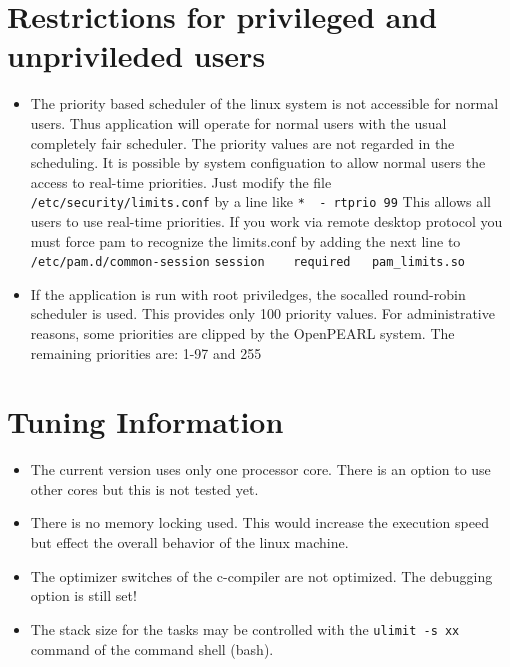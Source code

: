 \documentclass[10pt]{scrbook}
\begin{document}
\section{Restrictions for privileged and unprivileded users}
\begin{itemize}
\item The priority based scheduler of the linux system is not
   accessible for normal users. Thus application will operate for 
   normal users with
   the usual completely fair scheduler. The priority values are 
   not regarded in the scheduling.
   It is possible by system configuation to allow normal users
   the access to real-time priorities. Just modify the file
   \verb|/etc/security/limits.conf| by a line like\newline
   \verb|*  - rtprio 99|\newline
   This allows all users to use real-time priorities.
   \newline
   If you work via remote desktop protocol you must force pam to
   recognize the limits.conf by adding the next line to \verb|/etc/pam.d/common-session|
   \newline
   \verb|session    required   pam_limits.so|
\item If the application is run with root priviledges, the socalled 
  round-robin scheduler is used. This provides only 100 priority values.
  For administrative reasons, some priorities are clipped by the OpenPEARL
  system.
  The remaining priorities are: 1-97 and 255
\end{itemize}

\section{Tuning Information}
\begin{itemize}
\item The current version uses only one processor core.
     There is an option to use other cores but this is not tested yet.
\item There is no memory locking used.
     This would increase the execution speed but effect the overall
     behavior of the linux machine.
\item The optimizer switches of the c-compiler are not optimized.
   The debugging option is still set!
\item The stack size for the tasks may be controlled with the
   \texttt{ulimit -s xx} command of the command shell (bash).
\end{itemize}
\end{document}
